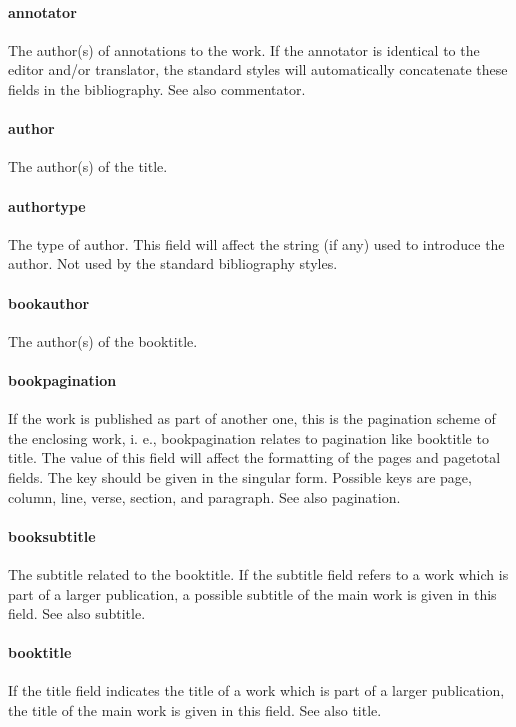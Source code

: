 \documentclass[a4paper,12pt]{report}
\begin{document}
\paragraph{annotator}
The author(s) of annotations to the work. If the annotator is identical to the editor
and/or translator, the standard styles will automatically concatenate these fields in the
bibliography. See also commentator.

\paragraph{author}
The author(s) of the title.

\paragraph{authortype}
The type of author. This field will affect the string (if any) used to introduce the author.
Not used by the standard bibliography styles.

\paragraph{bookauthor}
The author(s) of the booktitle.

\paragraph{bookpagination}
If the work is published as part of another one, this is the pagination scheme of the enclosing
work, i. e., bookpagination relates to pagination like booktitle to title. The value of
this field will affect the formatting of the pages and pagetotal fields. The key should
be given in the singular form. Possible keys are page, column, line, verse, section, and
paragraph. See also pagination.

\paragraph{booksubtitle}
The subtitle related to the booktitle. If the subtitle field refers to a work which is part
of a larger publication, a possible subtitle of the main work is given in this field. See also
subtitle.

\paragraph{booktitle}
If the title field indicates the title of a work which is part of a larger publication, the title
of the main work is given in this field. See also title.
\end{document}
